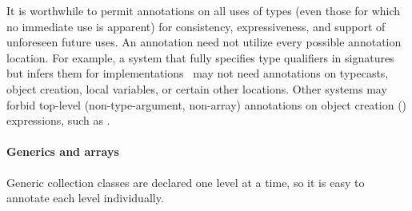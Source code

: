 \documentclass[10pt]{article}
\begin{document}
It is worthwhile to permit annotations on all uses of types (even those for
which no immediate use is apparent) for consistency, expressiveness, and
support of unforeseen future uses.
%
An annotation need not utilize every
possible annotation location.  For example, a system that fully specifies
type qualifiers in signatures but infers them for implementations~\cite{GreenfieldboyceF2005}
may not need annotations on typecasts, object creation, local variables, or
certain other locations.  Other
systems may forbid top-level (non-type-argument, non-array) annotations
on object creation () expressions, such as .


\paragraph{Generics and arrays\label{generics-and-arrays}}
Generic collection classes are
declared one level at a time, so it is easy to annotate each level
individually.
\end{document}
